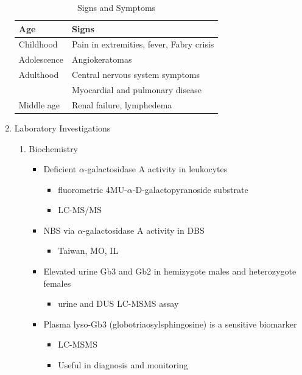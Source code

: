 \documentclass{scrartcl}
\begin{document}
\begin{enumerate}
\begin{table}[htbp]
\caption{\label{tab:org518e1d6}
Signs and Symptoms}
\centering
\begin{tabular}{ll}
Age & Signs\\
\hline
Childhood & Pain in extremities, fever, Fabry crisis \footnotemark\\
Adolescence & Angiokeratomas\\
Adulthood & Central nervous system symptoms\\
 & Myocardial and pulmonary disease\\
Middle age & Renal failure, lymphedema\\
\end{tabular}
\end{table}


\item Laboratory Investigations
\label{sec:orga287c9e}

\begin{enumerate}
\item Biochemistry
\label{sec:orgb5c1f34}
\begin{itemize}
\item Deficient \(\alpha\)-galactosidase A activity in leukocytes
\begin{itemize}
\item fluorometric 4MU-\(\alpha\)-D-galactopyranoside substrate
\item LC-MS/MS
\end{itemize}
\item NBS via \(\alpha\)-galactosidase A activity in DBS
\begin{itemize}
\item Taiwan, MO, IL
\end{itemize}
\item Elevated urine Gb3 and Gb2 in hemizygote males and heterozygote females
\begin{itemize}
\item urine and DUS LC-MSMS assay
\end{itemize}
\item Plasma lyso-Gb3 (globotriaosylsphingosine) is a sensitive biomarker
\begin{itemize}
\item LC-MSMS
\item Useful in diagnosis and monitoring
\end{itemize}
\end{itemize}


\end{enumerate}
\end{enumerate}
\end{document}
